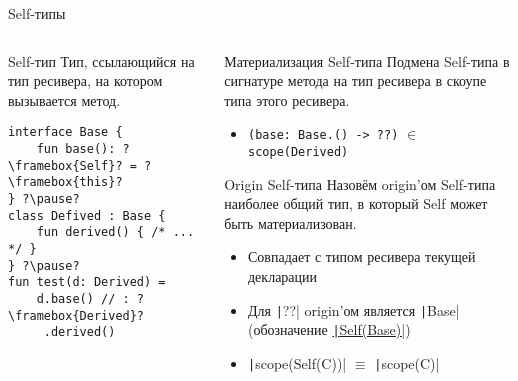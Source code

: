 \documentclass[handout,aspectratio=169,usenames,dvipsnames]{beamer}
\begin{document}
    \begin{frame}[fragile]{Self-типы}
        \begin{columns}[onlytextwidth]
            \begin{column}[t]{0.43\textwidth}
                \begin{block}{Self-тип}
                    Тип, ссылающийся на тип ресивера, на котором вызывается метод.
                    \pause
                    \begin{verbatim}
interface Base {
    fun base(): ?\framebox{Self}? = ?\framebox{this}?
} ?\pause?
class Defived : Base {
    fun derived() { /* ... */ }
} ?\pause?
fun test(d: Derived) =
    d.base() // : ?\framebox{Derived}?
     .derived()
                    \end{verbatim}
                \end{block}
            \end{column}\hfill%
            \begin{column}[t]{0.53\textwidth}
                \pause
                \begin{block}{Материализация Self-типа}
                    Подмена Self-типа в сигнатуре метода на тип ресивера в скоупе типа этого ресивера.
                    \pause
                    \begin{itemize}
                        \item \texttt{(base: Base.() -> ??)} $\in$ \texttt{scope(Derived)}
                    \end{itemize}
                \end{block}
                \pause
                \begin{block}{Origin Self-типа}
                    Назовём origin'ом Self-типа наиболее общий тип, в который Self может быть материализован. \pause
                    \begin{itemize}
                        \item Совпадает с типом ресивера текущей декларации
                        \item Для \texttt|??| origin'ом является \texttt|Base| (обозначение \underline{\texttt|Self(Base)|})
                        \item \texttt|scope(Self(C))| $\equiv$ \texttt|scope(C)|
                    \end{itemize}
                \end{block}
            \end{column}
        \end{columns}
    \end{frame}
\end{document}
